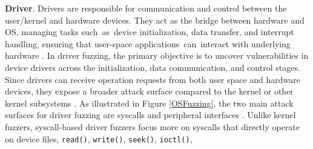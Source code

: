 
\textbf{Driver}. Drivers are responsible for communication and control between the user/kernel and hardware devices. They act as the bridge between hardware and OS, managing tasks such~as~device initialization, data transfer, and interrupt handling, ensuring that user-space applications~can~interact with underlying hardware \cite{Chou2001AnES, Palix2011FaultsIL, Stoep2018AndroidSecurity}. In driver fuzzing, the primary objective is to uncover vulnerabilities in device drivers across the initialization, data communication, and control stages. Since drivers can receive operation requests from both user space and hardware devices, they expose a broader attack surface compared to the kernel or other kernel subsystems \cite{Beniamini2017Part1, Beniamini2017Part2, Chang2017, Davis2011, NohlLell2014}. As illustrated in Figure \ref{OSFuzzing}, the two main attack surfaces for driver fuzzing are syscalls  and peripheral interfaces . Unlike kernel fuzzers, syscall-based driver fuzzers focus more on syscalls that directly operate on device files, \eg \texttt{read()}, \texttt{write()}, \texttt{seek()}, \texttt{ioctl()}, \etc

